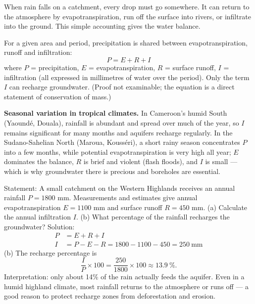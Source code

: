 \documentclass[11pt]{article}
\newcounter{popsec}
\newcounter{popsub}
\newcommand{\courssub}[1]{%
  \stepcounter{popsub}%
  \par\vspace{9pt}\noindent{\popxbold\fontsize{11.5}{13}\selectfont\color{popink}{\color{poporange}\thepopsec.\thepopsub}\hspace{6pt}#1}\par\nopagebreak\vspace{4pt}
}
\begin{document}
\courssub{The Water Balance: $P = E + R + I$}

When rain falls on a catchment, every drop must go somewhere. It can return to the atmosphere by evapotranspiration, run off the surface into rivers, or infiltrate into the ground. This simple accounting gives the water balance.

\begin{propriete}
For a given area and period, precipitation is shared between evapotranspiration, runoff and infiltration:
\[ P = E + R + I \]
where $P$ = precipitation, $E$ = evapotranspiration, $R$ = surface runoff, $I$ = infiltration (all expressed in millimetres of water over the period). Only the term $I$ can recharge groundwater. (Proof not examinable; the equation is a direct statement of conservation of mass.)
\end{propriete}

\textbf{Seasonal variation in tropical climates.} In Cameroon's humid South (Yaoundé, Douala), rainfall is abundant and spread over much of the year, so $I$ remains significant for many months and aquifers recharge regularly. In the Sudano-Sahelian North (Maroua, Kousséri), a short rainy season concentrates $P$ into a few months, while potential evapotranspiration is very high all year; $E$ dominates the balance, $R$ is brief and violent (flash floods), and $I$ is small --- which is why groundwater there is precious and boreholes are essential.

\begin{exoresolu}
Statement: A small catchment on the Western Highlands receives an annual rainfall $P = 1800$ mm. Measurements and estimates give annual evapotranspiration $E = 1100$ mm and surface runoff $R = 450$ mm. (a) Calculate the annual infiltration $I$. (b) What percentage of the rainfall recharges the groundwater?
\tcblower
Solution:
\begin{align*}
P &= E + R + I \\
I &= P - E - R = 1800 - 1100 - 450 = 250\ \text{mm}
\end{align*}
(b) The recharge percentage is
\[ \frac{I}{P} \times 100 = \frac{250}{1800} \times 100 \approx 13.9\ \%. \]
Interpretation: only about 14\% of the rain actually feeds the aquifer. Even in a humid highland climate, most rainfall returns to the atmosphere or runs off --- a good reason to protect recharge zones from deforestation and erosion.
\end{exoresolu}
\end{document}
